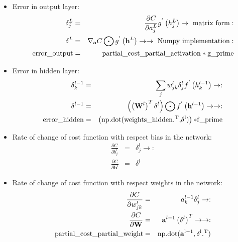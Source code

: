 \documentclass[11pt,onecolumn]{article}
\begin{document}
\begin{itemize}
  	\item Error in output layer: 
	\begin{eqnarray}
	        \delta^{L}_{j} &=& \frac{ \partial C}{\partial a^{L}_{j}}g^{'}\left( {h}^{L}_{j}\right) \rightarrow \mathrm{~matrix ~ form:} \\
		\delta^{L} &=& \nabla_{\mathbf{a}}C \bigodot g^{'}\left( \mathbf{h}^{L} \right) \rightarrow \rightarrow \mathrm{~Numpy ~ implementation:} \\
		\rm{error\_output} &= &  \rm{partial\_cost\_partial\_activation*g\_prime}
	\end{eqnarray} 
	\item Error in hidden layer: 
	\begin{eqnarray}
		\delta^{l-1}_{k} &=& \sum_{j}w^{l}_{jk}\delta^{l}_{j}f^{'}\left( h^{l-1}_k \right) \rightarrow : \\
		\delta^{l-1} &=& \left(\left(\mathbf{W}^{l}\right)^{T}\delta^{l} \right) \bigodot f^{'}\left( \mathbf{h}^{l-1}\right) \rightarrow \rightarrow:  \\
		\rm{error\_hidden} &=&  \left (\rm{np.dot(weights\_hidden.^{T},}\delta^{l}) \right) \rm{*f\_prime}
	\end{eqnarray}
	\item Rate of change of cost function with respect bias in the network:  
	\begin{eqnarray}
		\frac{\partial C}{\partial b^{l}_{j} } &=& \delta^{l}_{j} \rightarrow : \\
		\frac{\partial C}{\partial \mathbf{b}^{l} } &=& \delta^{l}
	\end{eqnarray}
	\item Rate of change of cost function with respect weights in the network: 
	\begin{eqnarray}
	 	\frac{\partial C}{\partial w^{l}_{jk} } &=& a^{l-1}_{k}\delta^{l}_{j} \rightarrow : \\
		\frac{\partial C}{\partial \mathbf{W}} &=& \mathbf{a}^{l-1} \left(\delta^{l}\right)^{T} \rightarrow \rightarrow:  \\
		\rm{partial\_cost\_partial\_weight} &= & \rm{np.dot}(\mathbf{a}^{l-1},\delta^{l}\rm{.^{T}})
	\end{eqnarray} 

\end{itemize}
\end{document}
